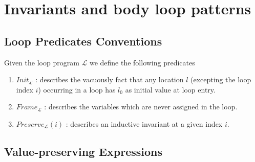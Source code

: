 \documentclass[a4paper,10pt]{article}
\newcommand{\prog}{\ensuremath{\mathcal{L}}\xspace}
\newcommand{\idx}{\ensuremath{i}\xspace}
\newcommand{\initcond}[1]{\ensuremath{\mathit{Init_{#1}}}}
\newcommand{\framecond}[1]{\ensuremath{\mathit{Frame_{#1}}}}
\newcommand{\preservecond}[2]{\ensuremath{\mathit{Preserve_{#1}(#2)}}}
\begin{document}
\section{Invariants and body loop patterns}

\subsection{Loop Predicates Conventions}
Given the loop program \prog we define the following predicates 
\begin{enumerate}
\item \initcond{\prog} : describes the vacuously fact that any location $l$ 
(excepting the loop index \idx) occurring in  a loop has $l_0$ as initial value at loop entry.
\item \framecond{\prog} : describes the variables which are never assigned in the loop.
\item \preservecond{\prog}{\idx} : describes an inductive invariant at a given index \idx.
\end{enumerate}

\subsection{Value-preserving Expressions}
\end{document}
